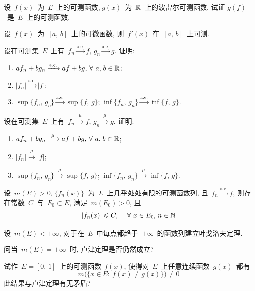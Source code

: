 \begin{problemset}
\item 设~$f(x)$~为~$E$~上的可测函数, $g(x)$~为~$\mathbb{R}$~上的波雷尔可测函数, 试证 $g(f)$~是~$E$~上的可测函数.

\item 设~$f(x)$~为~$[a,\,b]$~上的可微函数, 则~$f'(x)$~在~$[a,\,b]$~上可测.

\item 设在可测集~$E$~上有~$f_n \xrightarrow{\mathrm{a.e.}} f, \, g_n \xrightarrow{\mathrm{a.e.}} g$. 证明:

\begin{enumerate}
  \item[(1)] $a f_n + b g_n \xrightarrow{\mathrm{a.e.}} a f + b g, \, \forall~a,\,b \in \mathbb{R}$;
  \item[(2)] $|f_n| \xrightarrow{\mathrm{a.e.}} |f|$;
  \item[(3)] $\sup\{f_n,\,g_n\} \xrightarrow{\mathrm{a.e.}} \sup\{f,\,g\}$; $\inf\{f_n,\,g_n\} \xrightarrow{\mathrm{a.e.}} \inf\{f,\,g\}$.
\end{enumerate}

\item 设在可测集~$E$~上有~$f_n \xrightarrow{~\mu~} f, \, g_n \xrightarrow{~\mu~} g$. 证明:

\begin{enumerate}
  \item[(1)] $a f_n + b g_n \xrightarrow{~\mu~} a f + b g, \, \forall~a,\,b \in \mathbb{R}$;
  \item[(2)] $|f_n| \xrightarrow{~\mu~} |f|$;
  \item[(3)] $\sup\{f_n,\,g_n\} \xrightarrow{~\mu~} \sup\{f,\,g\}$; $\inf\{f_n,\,g_n\} \xrightarrow{~\mu~} \inf\{f,\,g\}$.
\end{enumerate}

\item 设~$m(E) > 0$, $\{f_n(x)\}$~为~$E$~上几乎处处有限的可测函数列, 且~$f_n \xrightarrow{\mathrm{a.e.}} f$, 则存在常数~$C$~与~$E_0 \subset E$, 满足~$m(E_0) > 0$, 且
    \[
    |f_n(x)| \leqslant C, \, \quad \forall~x \in E_0, \, n \in \mathbb{N}
    \]

\item 设~$m(E) < +\infty$, 对于在~$E$~中每点都趋于~$+\infty$~的函数列建立叶戈洛夫定理.

\item 问当~$m(E)=+\infty$~时, 卢津定理是否仍然成立?

\item 试作~$E = [0,\,1]$~上的可测函数~$f(x)$, 使得对~$E$~上任意连续函数~$g(x)$~都有
    \[
    m\big(\{x \in E: \: f(x) \neq g(x)\} \big) \neq 0
    \]
    此结果与卢津定理有无矛盾?


\end{problemset}
